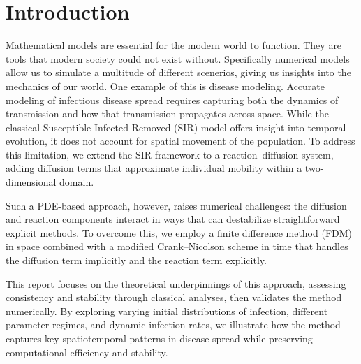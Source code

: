 \section{Introduction}
Mathematical models are essential for the modern world to function. They are tools that modern society could not 
exist without. Specifically numerical models allow us to simulate a multitude of different scenerios, giving us 
insights into the mechanics of our world. One example of this is disease modeling. Accurate modeling of infectious disease spread requires capturing both the dynamics of transmission and how that
transmission propagates across space. While the classical Susceptible Infected Removed (SIR) model offers 
insight into temporal evolution, it does not account for spatial movement of the population. To address 
this limitation, we extend the SIR framework to a reaction--diffusion system, adding diffusion terms that 
approximate individual mobility within a two-dimensional domain. 

Such a PDE-based approach, however, raises numerical challenges: the diffusion and reaction components 
interact in ways that can destabilize straightforward explicit methods. To overcome this, 
we employ a finite difference method (FDM) in space combined with a modified Crank--Nicolson scheme in 
time that handles the diffusion term implicitly and the reaction term explicitly. 

This report focuses on the theoretical underpinnings of this approach, assessing consistency and stability 
through classical analyses, then validates the method numerically. By exploring varying initial distributions 
of infection, different parameter regimes, and dynamic infection rates, we illustrate how the method captures 
key spatiotemporal patterns in disease spread while preserving computational efficiency and stability.




